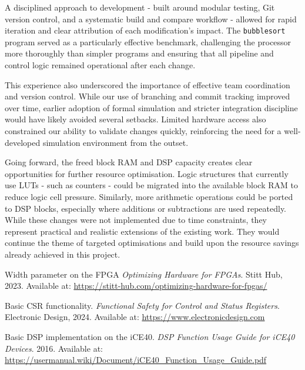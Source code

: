 \documentclass[a4paper,10pt]{article}
\begin{document}
A disciplined approach to development - built around modular testing, 
Git version control, and a systematic build and compare workflow - 
allowed for rapid iteration and clear attribution of each modification's impact. 
The \texttt{bubblesort} program served as a particularly effective benchmark, 
challenging the processor more thoroughly than simpler programs and 
ensuring that all pipeline and control logic remained operational after each change.

This experience also underscored the importance of 
effective team coordination and version control. 
While our use of branching and commit tracking improved over time, 
earlier adoption of formal simulation and stricter integration discipline 
would have likely avoided several setbacks. 
Limited hardware access also constrained our ability to validate changes quickly, 
reinforcing the need for a well-developed simulation environment from the outset.

Going forward, the freed block RAM and DSP capacity creates clear opportunities 
for further resource optimisation. 
Logic structures that currently use LUTs - such as counters - 
could be migrated into the available block RAM to reduce logic cell pressure. 
Similarly, more arithmetic operations could be ported to DSP blocks, 
especially where additions or subtractions are used repeatedly. 
While these changes were not implemented due to time constraints, 
they represent practical and realistic extensions of the existing work. 
They would continue the theme of targeted 
optimisations and build upon the 
resource savings already achieved in this project.

\begin{thebibliography}{9}

Width parameter on the FPGA \textit{Optimizing Hardware for FPGAs}. Stitt Hub, 2023. 
Available at: 
\url{https://stitt-hub.com/optimizing-hardware-for-fpgas/}

 Basic CSR functionality.
\textit{Functional Safety for Control and Status Registers}. 
Electronic Design, 2024. Available at:  
\href{https://www.electronicdesign.com/technologies/eda/article/55040504/arteris-ip-exploring-soc-design-control-and-status-registers-for-functional-safety}{https://www.electronicdesign.com}

Basic DSP implementation on the iCE40. 
\textit{DSP Function Usage Guide for iCE40 Devices}. 
2016. Available at: 
\href{https://usermanual.wiki/Document/iCE4020DSPFunction20Usage20Guide.2104308747.pdf}{https://usermanual.wiki/Document/iCE40\_Function\_Usage\_Guide.pdf}

\end{thebibliography}
\end{document}
